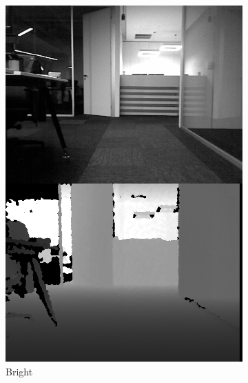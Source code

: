 \documentclass[]{spie}  %
\begin{document}
\begin{figure}[!htb]
        \centering
        
        \begin{subfigure}[b]{0.27\textwidth}
        \centering
        \includegraphics[trim = 0mm 0mm 0mm 0mm, clip, width=\textwidth]{figures/dataset_bright.png}    
        \caption{Bright}
        \label{subfig:dataset_bright}
        \end{subfigure}
        ~ 
        \begin{subfigure}[b]{0.27\textwidth}
        \centering

\end{subfigure}
\end{figure}
\end{document}
